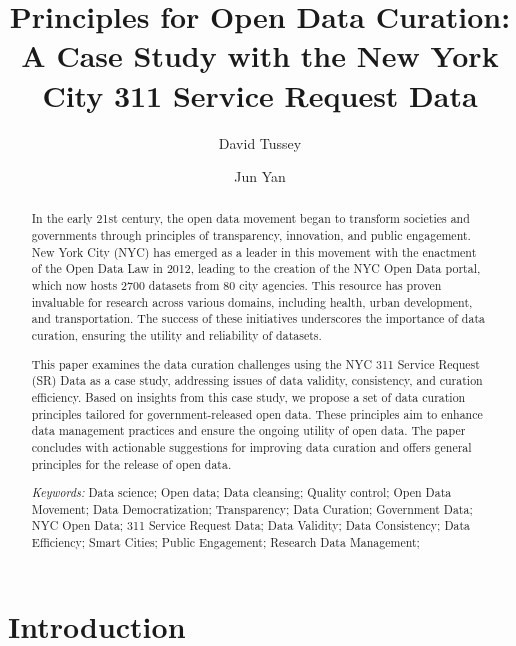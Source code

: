 \documentclass[12pt, titlepage]{article}
\title{Principles for Open Data Curation: A Case Study with the New
  York City 311 Service Request Data}
\author[1]{David Tussey}
\author[2]{Jun Yan}
\affil[1]{Former Executive Director, NYC DoITT}
\affil[2]{Department of Statistics, University of Connecticut}
\begin{document}
\maketitle




\begin{abstract}
  In the early 21st century, the open data movement began to transform societies and governments through principles of transparency, 
  innovation, and public engagement. New York City (NYC) has emerged as a leader in this movement 
  with the enactment of the Open Data Law in 2012, leading to the creation of the NYC Open Data portal, 
  which now hosts 2700 datasets from 80 city agencies. This resource has proven invaluable for research 
  across various domains, including health, urban development, and transportation. 
  The success of these initiatives underscores the importance of data curation, ensuring the utility and reliability of datasets. 

This paper examines the data curation challenges using the NYC 311 Service Request (SR) Data as a case study, 
  addressing issues of data validity, consistency, and curation efficiency. Based on insights from this case study, 
  we propose a set of data curation principles tailored for government-released open data. 
  These principles aim to enhance data management practices and ensure the ongoing utility of open data. 
  The paper concludes with actionable suggestions for improving data curation 
  and offers general principles for the release of open data.


\bigskip
  
\noindent
{\it Keywords:}
Data science;
Open data;
Data cleansing;
Quality control;
Open Data Movement;
Data Democratization;
Transparency;
Data Curation;
Government Data;
NYC Open Data;
311 Service Request Data;
Data Validity;
Data Consistency;
Data Efficiency;
Smart Cities;
Public Engagement;
Research Data Management;

\end{abstract}

\doublespacing

\section{Introduction} \label{sec:intro}
\end{document}
